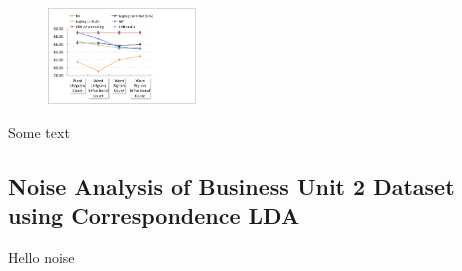 \begin{figure}
\centering
\includegraphics[width=0.35\textwidth]{images/BU1-mean-micro-precision}
\label{Figure_BU1-predictions-feature-averages}
\end{figure}
Some text

\subsection{Noise Analysis of Business Unit 2 Dataset using Correspondence LDA}
\label{Subsect:BU2-noise-analysis}

Hello noise